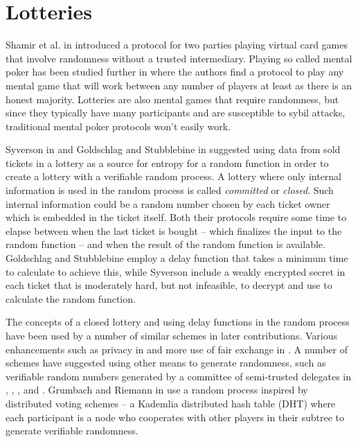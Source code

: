 \section{Lotteries}
\label{sec:lotteries}


Shamir et al. in \cite{shamir_mental_1981} introduced a protocol for two parties playing virtual card games that involve randomness without a trusted intermediary. Playing so called mental poker has been studied further in \cite{goldreich_how_1987} where the authors find a protocol to play any mental game that will work between any number of players at least as there is an honest majority. Lotteries are also mental games that require randomness, but since they typically have many participants and are susceptible to sybil attacks, traditional mental poker protocols won't easily work. 

Syverson in \cite{syverson_weakly_1998} and Goldschlag and Stubblebine in \cite{goldschlag_publicly_1998} suggested using data from sold tickets in a lottery as a source for entropy for a random function in order to create a lottery with a verifiable random process. A lottery where only internal information is used in the random process is called \emph{committed} or \emph{closed}. Such internal information could be a random number chosen by each ticket owner which is embedded in the ticket itself. Both their protocols require some time to elapse between when the last ticket is bought – which finalizes the input to the random function – and when the result of the random function is available. Goldschlag and Stubblebine employ a delay function that takes a minimum time to calculate to achieve this, while Syverson include a weakly encrypted secret in each ticket that is moderately hard, but not infeasible, to decrypt and use to calculate the random function.

The concepts of a closed lottery and using delay functions in the random process have been used by a number of similar schemes in later contributions. Various enhancements such as privacy in \cite{zhou_playing_2001} and more use of fair exchange in \cite{chow_e-lottery_2005}. A number of schemes have suggested using other means to generate randomness, such as verifiable random numbers generated by a committee of semi-trusted delegates in \cite{fouque_sharing_2001}, \cite{lee_design_2009}, \cite{liu_improved_2014}, and \cite{xia_information_2019}. Grumbach and Riemann in \cite{grumbach_distributed_2017} use a random process inspired by distributed voting schemes – a Kademlia distributed hash table (DHT) where each participant is a node who cooperates with other players in their subtree to generate verifiable randomness. 

